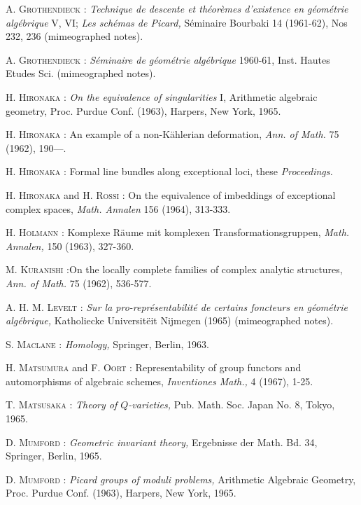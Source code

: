 \begin{thebibliography}{99}
 \textsc{A. Grothendieck :} {\em Technique de descente et th\'eor\`emes d'existence en g\'eom\'etrie alg\'ebrique} V, VI; {\em Les sch\'emas de Picard,} S\'eminaire Bourbaki 14 (1961-62), Nos 232, 236 (mimeographed notes).

 \textsc{A. Grothendieck :} {\em S\'eminaire de g\'eom\'etrie alg\'ebrique} 1960-61, Inst. Hautes Etudes Sci. (mimeographed notes).

 \textsc{H. Hironaka :} {\em On the equivalence of singularities} I, Arithmetic algebraic geometry, Proc. Purdue Conf. (1963), Harpers, New York, 1965.

 \textsc{H. Hironaka :} An example of a non-K\"ahlerian deformation, {\em Ann. of Math.} 75 (1962), 190---.

 \textsc{H. Hironaka :} Formal line bundles along exceptional loci, these {\em Proceedings.}

 \textsc{H. Hironaka} and \textsc{H. Rossi :} On the equivalence of imbeddings of exceptional complex spaces, {\em Math. Annalen} 156 (1964), 313-333.

 \textsc{H. Holmann :} Komplexe R\"aume mit komplexen Transformationsgruppen, {\em Math. Annalen,} 150 (1963), 327-360.

 \textsc{M. Kuranishi :}\pageoriginale On the locally complete families of complex analytic structures, {\em Ann. of Math.} 75 (1962), 536-577.

 \textsc{A. H. M. Levelt :} {\em Sur la pro-repr\'esentabilit\'e de certains foncteurs en g\'eom\'etrie alg\'ebrique,} Katholiecke Universit\"eit Nijmegen (1965) (mimeographed notes).

 \textsc{S. Maclane :} {\em Homology,} Springer, Berlin, 1963.

 \textsc{H. Matsumura} and \textsc{F. Oort :} Representability of group functors and automorphisms of algebraic schemes, {\em Inventiones Math.,} 4 (1967), 1-25.

 \textsc{T. Matsusaka :} {\em Theory of $Q$-varieties,} Pub. Math. Soc. Japan No. 8, Tokyo, 1965.

 \textsc{D. Mumford :} {\em Geometric invariant theory,} Ergebnisse der Math. Bd. 34, Springer, Berlin, 1965.

 \textsc{D. Mumford :} {\em Picard groups of moduli problems,} Arithmetic Algebraic Geometry, Proc. Purdue Conf. (1963), Harpers, New York, 1965.


\end{thebibliography}
